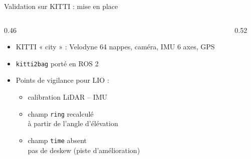 \begin{frame}{Validation sur KITTI : mise en place}
  \begin{columns}[c]
    \begin{column}{0.46\textwidth}
      \begin{itemize}
        \item KITTI « city » : Velodyne 64 nappes, caméra, IMU 6 axes, GPS
        \item \texttt{kitti2bag} porté en \alert{ROS 2}
        \item Points de vigilance pour LIO :
        \begin{itemize}
          \item calibration \alert{LiDAR -- IMU}
          \item champ \texttt{ring} \alert{recalculé}\\
                {\footnotesize\color{textgray} à partir de l'angle d'élévation}
          \item champ \texttt{time} absent\\
                {\footnotesize\color{textgray} pas de deskew (piste d'amélioration)}
        \end{itemize}
      \end{itemize}
    \end{column}
    \begin{column}{0.52\textwidth}
      \centering
      \\
    \end{column}
  \end{columns}
\end{frame}


